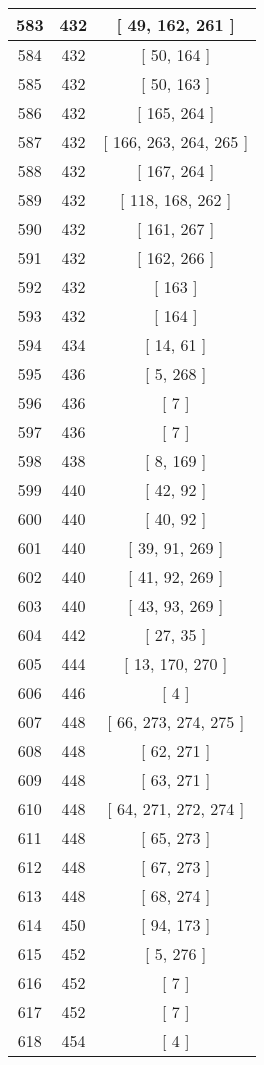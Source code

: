 \begin{center}
\begin{longtable}[H]{|| c c c ||}
583 & 432 & [ 49, 162, 261 ]
\\\hline
584 & 432 & [ 50, 164 ]
\\\hline
585 & 432 & [ 50, 163 ]
\\\hline
586 & 432 & [ 165, 264 ]
\\\hline
587 & 432 & [ 166, 263, 264, 265 ]
\\\hline
588 & 432 & [ 167, 264 ]
\\\hline
589 & 432 & [ 118, 168, 262 ]
\\\hline
590 & 432 & [ 161, 267 ]
\\\hline
591 & 432 & [ 162, 266 ]
\\\hline
592 & 432 & [ 163 ]
\\\hline
593 & 432 & [ 164 ]
\\\hline
594 & 434 & [ 14, 61 ]
\\\hline
595 & 436 & [ 5, 268 ]
\\\hline
596 & 436 & [ 7 ]
\\\hline
597 & 436 & [ 7 ]
\\\hline
598 & 438 & [ 8, 169 ]
\\\hline
599 & 440 & [ 42, 92 ]
\\\hline
600 & 440 & [ 40, 92 ]
\\\hline
601 & 440 & [ 39, 91, 269 ]
\\\hline
602 & 440 & [ 41, 92, 269 ]
\\\hline
603 & 440 & [ 43, 93, 269 ]
\\\hline
604 & 442 & [ 27, 35 ]
\\\hline
605 & 444 & [ 13, 170, 270 ]
\\\hline
606 & 446 & [ 4 ]
\\\hline
607 & 448 & [ 66, 273, 274, 275 ]
\\\hline
608 & 448 & [ 62, 271 ]
\\\hline
609 & 448 & [ 63, 271 ]
\\\hline
610 & 448 & [ 64, 271, 272, 274 ]
\\\hline
611 & 448 & [ 65, 273 ]
\\\hline
612 & 448 & [ 67, 273 ]
\\\hline
613 & 448 & [ 68, 274 ]
\\\hline
614 & 450 & [ 94, 173 ]
\\\hline
615 & 452 & [ 5, 276 ]
\\\hline
616 & 452 & [ 7 ]
\\\hline
617 & 452 & [ 7 ]
\\\hline
618 & 454 & [ 4 ]
\\\hline

\end{longtable}
\end{center}
